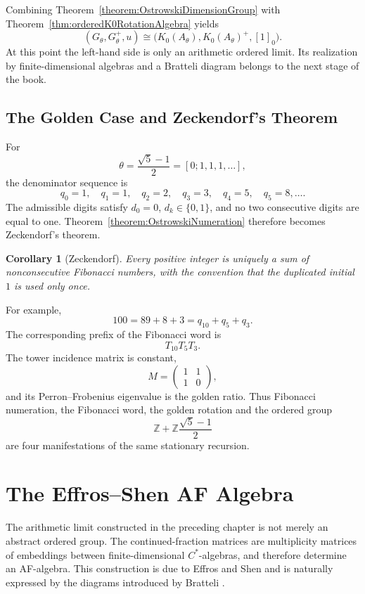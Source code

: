 \documentclass{book}
\newtheorem{corollary}[definition]{Corollary}
\begin{document}
Combining Theorem~\ref{theorem:OstrowskiDimensionGroup} with
Theorem~\ref{thm:orderedK0RotationAlgebra} yields
\[
  (G_\theta,G_\theta^+,u)
  \cong
  \bigl(K_0(A_\theta),K_0(A_\theta)^+,[1]_0\bigr).
\]
At this point the left-hand side is only an arithmetic ordered limit.  Its
realization by finite-dimensional algebras and a Bratteli diagram belongs
to the next stage of the book.

\section{The Golden Case and Zeckendorf's Theorem}

For
\[
  \theta=\frac{\sqrt5-1}{2}=[0;1,1,1,\ldots],
\]
the denominator sequence is
\[
  q_0=1,\quad q_1=1,\quad q_2=2,\quad q_3=3,\quad
  q_4=5,\quad q_5=8,\ldots.
\]
The admissible digits satisfy \(d_0=0\), \(d_k\in\{0,1\}\), and no two
consecutive digits are equal to one.  Theorem~\ref{theorem:OstrowskiNumeration}
therefore becomes Zeckendorf's theorem.

\begin{corollary}[Zeckendorf]
  Every positive integer is uniquely a sum of nonconsecutive Fibonacci
  numbers, with the convention that the duplicated initial \(1\) is used
  only once.
\end{corollary}

For example,
\[
  100=89+8+3=q_{10}+q_5+q_3.
\]
The corresponding prefix of the Fibonacci word is
\[
  T_{10}T_5T_3.
\]
The tower incidence matrix is constant,
\[
  M=
  \begin{pmatrix}1&1\\1&0\end{pmatrix},
\]
and its Perron--Frobenius eigenvalue is the golden ratio.  Thus Fibonacci
numeration, the Fibonacci word, the golden rotation and the ordered group
\[
  \mathbb Z+\mathbb Z\frac{\sqrt5-1}{2}
\]
are four manifestations of the same stationary recursion.

\chapter{The Effros--Shen AF Algebra}

The arithmetic limit constructed in the preceding chapter is not merely an
abstract ordered group.  The continued-fraction matrices are multiplicity
matrices of embeddings between finite-dimensional \(C^*\)-algebras, and
therefore determine an AF-algebra.  This construction is due to Effros and
Shen \cite{EffrosShen1980} and is naturally expressed by the diagrams
introduced by Bratteli \cite{Bratteli1972}.
\end{document}
